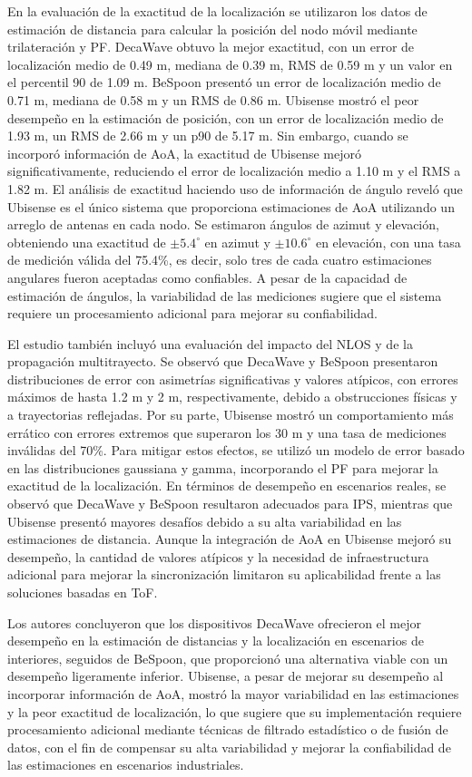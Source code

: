 \begin{enumerate}
    En la evaluación de la exactitud de la localización se utilizaron los datos de estimación de distancia para calcular la posición del nodo móvil mediante trilateración y PF. DecaWave obtuvo la mejor exactitud, con un error de localización medio de 0.49 m, mediana de 0.39 m, RMS de 0.59 m y un valor en el percentil 90 de 1.09 m. BeSpoon presentó un error de localización medio de 0.71 m, mediana de 0.58 m y un RMS de 0.86 m. Ubisense mostró el peor desempeño en la estimación de posición, con un error de localización medio de 1.93 m, un RMS de 2.66 m y un p90 de 5.17 m. Sin embargo, cuando se incorporó información de AoA, la exactitud de Ubisense mejoró significativamente, reduciendo el error de localización medio a 1.10 m y el RMS a 1.82 m. El análisis de exactitud haciendo uso de información de ángulo reveló que Ubisense es el único sistema que proporciona estimaciones de AoA utilizando un arreglo de antenas en cada nodo. Se estimaron ángulos de azimut y elevación, obteniendo una exactitud de $\pm5.4^\circ$ en azimut y $\pm10.6^\circ$ en elevación, con una tasa de medición válida del 75.4\%, es decir, solo tres de cada cuatro estimaciones angulares fueron aceptadas como confiables. A pesar de la capacidad de estimación de ángulos, la variabilidad de las mediciones sugiere que el sistema requiere un procesamiento adicional para mejorar su confiabilidad.

    El estudio también incluyó una evaluación del impacto del NLOS y de la propagación multitrayecto. Se observó que DecaWave y BeSpoon presentaron distribuciones de error con asimetrías significativas y valores atípicos, con errores máximos de hasta 1.2 m y 2 m, respectivamente, debido a obstrucciones físicas y a trayectorias reflejadas. Por su parte, Ubisense mostró un comportamiento más errático con errores extremos que superaron los 30 m y una tasa de mediciones inválidas del 70\%. Para mitigar estos efectos, se utilizó un modelo de error basado en las distribuciones gaussiana y gamma, incorporando el PF para mejorar la exactitud de la localización. En términos de desempeño en escenarios reales, se observó que DecaWave y BeSpoon resultaron adecuados para IPS, mientras que Ubisense presentó mayores desafíos debido a su alta variabilidad en las estimaciones de distancia. Aunque la integración de AoA en Ubisense mejoró su desempeño, la cantidad de valores atípicos y la necesidad de infraestructura adicional para mejorar la sincronización limitaron su aplicabilidad frente a las soluciones basadas en ToF.

    Los autores concluyeron que los dispositivos DecaWave ofrecieron el mejor desempeño en la estimación de distancias y la localización en escenarios de interiores, seguidos de BeSpoon, que proporcionó una alternativa viable con un desempeño ligeramente inferior. Ubisense, a pesar de mejorar su desempeño al incorporar información de AoA, mostró la mayor variabilidad en las estimaciones y la peor exactitud de localización, lo que sugiere que su implementación requiere procesamiento adicional mediante técnicas de filtrado estadístico o de fusión de datos, con el fin de compensar su alta variabilidad y mejorar la confiabilidad de las estimaciones en escenarios industriales.


\end{enumerate}
